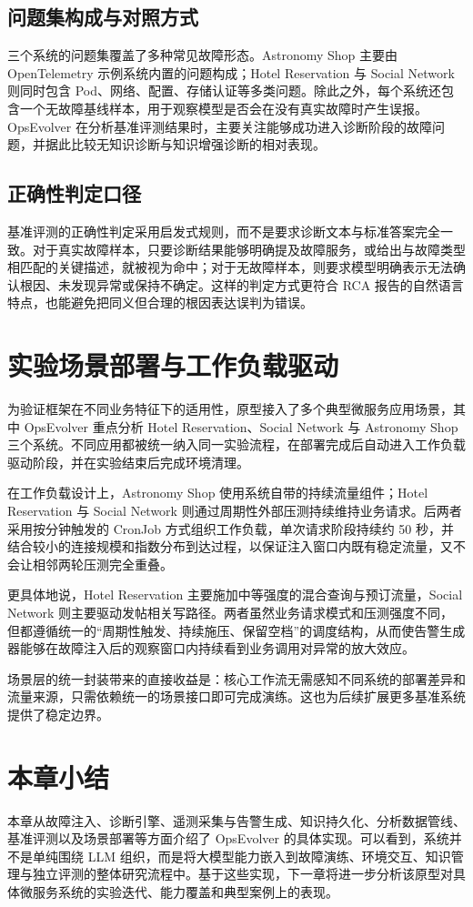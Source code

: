 \subsection{问题集构成与对照方式}

三个系统的问题集覆盖了多种常见故障形态。Astronomy Shop 主要由 OpenTelemetry 示例系统内置的问题构成；Hotel Reservation 与 Social Network 则同时包含 Pod、网络、配置、存储认证等多类问题。除此之外，每个系统还包含一个无故障基线样本，用于观察模型是否会在没有真实故障时产生误报。OpsEvolver 在分析基准评测结果时，主要关注能够成功进入诊断阶段的故障问题，并据此比较无知识诊断与知识增强诊断的相对表现。

\subsection{正确性判定口径}

基准评测的正确性判定采用启发式规则，而不是要求诊断文本与标准答案完全一致。对于真实故障样本，只要诊断结果能够明确提及故障服务，或给出与故障类型相匹配的关键描述，就被视为命中；对于无故障样本，则要求模型明确表示无法确认根因、未发现异常或保持不确定。这样的判定方式更符合 RCA 报告的自然语言特点，也能避免把同义但合理的根因表达误判为错误。

\section{实验场景部署与工作负载驱动}
\label{sec:scenario_impl}

为验证框架在不同业务特征下的适用性，原型接入了多个典型微服务应用场景，其中 OpsEvolver 重点分析 Hotel Reservation、Social Network 与 Astronomy Shop 三个系统。不同应用都被统一纳入同一实验流程，在部署完成后自动进入工作负载驱动阶段，并在实验结束后完成环境清理。

在工作负载设计上，Astronomy Shop 使用系统自带的持续流量组件；Hotel Reservation 与 Social Network 则通过周期性外部压测持续维持业务请求。后两者采用按分钟触发的 CronJob 方式组织工作负载，单次请求阶段持续约 50 秒，并结合较小的连接规模和指数分布到达过程，以保证注入窗口内既有稳定流量，又不会让相邻两轮压测完全重叠。

更具体地说，Hotel Reservation 主要施加中等强度的混合查询与预订流量，Social Network 则主要驱动发帖相关写路径。两者虽然业务请求模式和压测强度不同，但都遵循统一的“周期性触发、持续施压、保留空档”的调度结构，从而使告警生成器能够在故障注入后的观察窗口内持续看到业务调用对异常的放大效应。

场景层的统一封装带来的直接收益是：核心工作流无需感知不同系统的部署差异和流量来源，只需依赖统一的场景接口即可完成演练。这也为后续扩展更多基准系统提供了稳定边界。

\section{本章小结}
\label{sec:chap03_summary}

本章从故障注入、诊断引擎、遥测采集与告警生成、知识持久化、分析数据管线、基准评测以及场景部署等方面介绍了 OpsEvolver 的具体实现。可以看到，系统并不是单纯围绕 LLM 组织，而是将大模型能力嵌入到故障演练、环境交互、知识管理与独立评测的整体研究流程中。基于这些实现，下一章将进一步分析该原型对具体微服务系统的实验迭代、能力覆盖和典型案例上的表现。
